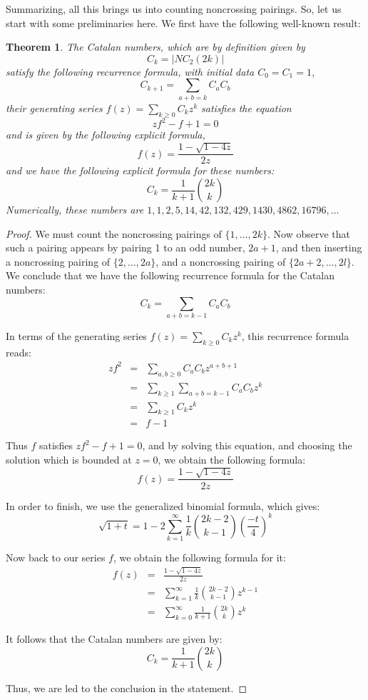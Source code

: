 \documentclass[12pt]{amsbook}
\newtheorem{theorem}{Theorem}[chapter]
\begin{document}
Summarizing, all this brings us into counting noncrossing pairings. So, let us start with some preliminaries here. We first have the following well-known result:

\begin{theorem}
The Catalan numbers, which are by definition given by
$$C_k=|NC_2(2k)|$$
satisfy the following recurrence formula, with initial data $C_0=C_1=1$,
$$C_{k+1}=\sum_{a+b=k}C_aC_b$$ 
their generating series $f(z)=\sum_{k\geq0}C_kz^k$ satisfies the equation
$$zf^2-f+1=0$$
and is given by the following explicit formula,
$$f(z)=\frac{1-\sqrt{1-4z}}{2z}$$ 
and we have the following explicit formula for these numbers:
$$C_k=\frac{1}{k+1}\binom{2k}{k}$$
Numerically, these numbers are $1,1,2,5,14,42,132,429,1430,4862,16796,\ldots$
\end{theorem}

\begin{proof}
We must count the noncrossing pairings of $\{1,\ldots,2k\}$. Now observe that such a pairing appears by pairing 1 to an odd number, $2a+1$, and then inserting a noncrossing pairing of $\{2,\ldots,2a\}$, and a noncrossing pairing of $\{2a+2,\ldots,2l\}$. We conclude that we have the following recurrence formula for the Catalan numbers:
$$C_k=\sum_{a+b=k-1}C_aC_b$$ 

In terms of the generating series $f(z)=\sum_{k\geq0}C_kz^k$, this recurrence formula reads:
\begin{eqnarray*}
zf^2
&=&\sum_{a,b\geq0}C_aC_bz^{a+b+1}\\
&=&\sum_{k\geq1}\sum_{a+b=k-1}C_aC_bz^k\\
&=&\sum_{k\geq1}C_kz^k\\
&=&f-1
\end{eqnarray*}

Thus $f$ satisfies $zf^2-f+1=0$, and by solving this equation, and choosing the solution which is bounded at $z=0$, we obtain the following formula:
$$f(z)=\frac{1-\sqrt{1-4z}}{2z}$$ 

In order to finish, we use the generalized binomial formula, which gives:
$$\sqrt{1+t}=1-2\sum_{k=1}^\infty\frac{1}{k}\binom{2k-2}{k-1}\left(\frac{-t}{4}\right)^k$$

Now back to our series $f$, we obtain the following formula for it:
\begin{eqnarray*}
f(z)
&=&\frac{1-\sqrt{1-4z}}{2z}\\
&=&\sum_{k=1}^\infty\frac{1}{k}\binom{2k-2}{k-1}z^{k-1}\\
&=&\sum_{k=0}^\infty\frac{1}{k+1}\binom{2k}{k}z^k
\end{eqnarray*}

It follows that the Catalan numbers are given by:
$$C_k=\frac{1}{k+1}\binom{2k}{k}$$

Thus, we are led to the conclusion in the statement.
\end{proof}
\end{document}
